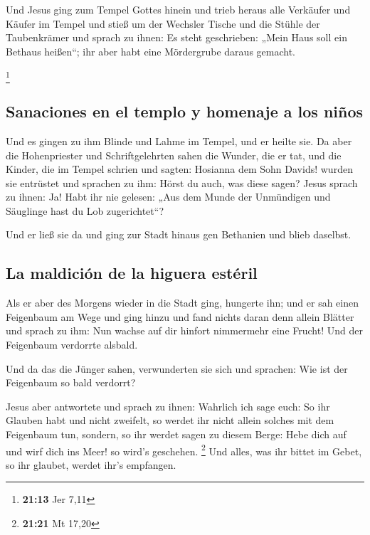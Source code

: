  Und Jesus ging zum Tempel Gottes hinein und trieb heraus
alle Verkäufer und Käufer im Tempel und stieß um der Wechsler Tische und
die Stühle der Taubenkrämer  und sprach zu ihnen: Es
steht geschrieben: „Mein Haus soll ein Bethaus heißen``; ihr aber habt
eine Mördergrube daraus gemacht.

\footnote{\textbf{21:13} Jer 7,11}

\hypertarget{sanaciones-en-el-templo-y-homenaje-a-los-niuxf1os}{%
\subsection{Sanaciones en el templo y homenaje a los
niños}\label{sanaciones-en-el-templo-y-homenaje-a-los-niuxf1os}}

 Und es gingen zu ihm Blinde und Lahme im Tempel, und er
heilte sie.  Da aber die Hohenpriester und
Schriftgelehrten sahen die Wunder, die er tat, und die Kinder, die im
Tempel schrien und sagten: Hosianna dem Sohn Davids! wurden sie
entrüstet  und sprachen zu ihm: Hörst du auch, was diese
sagen? Jesus sprach zu ihnen: Ja! Habt ihr nie gelesen: „Aus dem Munde
der Unmündigen und Säuglinge hast du Lob zugerichtet``?

 Und er ließ sie da und ging zur Stadt hinaus gen
Bethanien und blieb daselbst.

\hypertarget{la-maldiciuxf3n-de-la-higuera-estuxe9ril}{%
\subsection{La maldición de la higuera
estéril}\label{la-maldiciuxf3n-de-la-higuera-estuxe9ril}}

 Als er aber des Morgens wieder in die Stadt ging,
hungerte ihn;  und er sah einen Feigenbaum am Wege und
ging hinzu und fand nichts daran denn allein Blätter und sprach zu ihm:
Nun wachse auf dir hinfort nimmermehr eine Frucht! Und der Feigenbaum
verdorrte alsbald.

 Und da das die Jünger sahen, verwunderten sie sich und
sprachen: Wie ist der Feigenbaum so bald verdorrt?

 Jesus aber antwortete und sprach zu ihnen: Wahrlich ich
sage euch: So ihr Glauben habt und nicht zweifelt, so werdet ihr nicht
allein solches mit dem Feigenbaum tun, sondern, so ihr werdet sagen zu
diesem Berge: Hebe dich auf und wirf dich ins Meer! so wird's geschehen.
\footnote{\textbf{21:21} Mt 17,20}  Und alles, was ihr
bittet im Gebet, so ihr glaubet, werdet ihr's empfangen.

